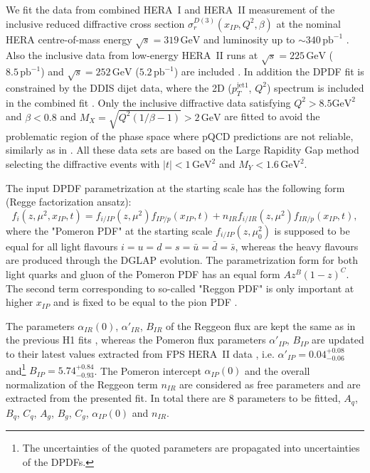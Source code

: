 \documentclass{PoS}
\newcommand{\IP}{I\!\!P}
\newcommand{\IR}{I\!\!R}
\newcommand{\xpom}{x_{\IP}}
\newcommand{\GeV}{\ensuremath{\mathrm{GeV}}\xspace}
\newcommand{\GeVsq}{\ensuremath{\mathrm{GeV}^2}\xspace}
\begin{document}
We fit the data from combined HERA~I and HERA~II measurement of the inclusive reduced diffractive cross section $\sigma_r^{D(3)}(\xpom, Q^2, \beta)$  at the nominal HERA centre-of-mass energy $\sqrt{s} = 319\,\GeV$ and luminosity up to $\sim\!\! 340\,\text{pb}^{-1}$  \cite{Aaron:2012ad}.
Also the inclusive data from low-energy HERA~II runs at $\sqrt{s} = 225\,\GeV$ ($8.5\,\text{pb}^{-1}$) and $\sqrt{s} = 252\,\GeV$ ($5.2\,\text{pb}^{-1}$) are included \cite{Aaron:2012zz}.
In addition the DPDF fit is constrained by the DDIS dijet data, where the 2D ($p_T^{\mathrm{jet}1}$, $Q^2$) spectrum is included in the combined fit \cite{Andreev:2014yra}.
Only the inclusive diffractive data satisfying $Q^2 > 8.5 \GeVsq$ and $\beta < 0.8$ and $M_X = \sqrt{Q^2(1/\beta - 1)} > 2\,\GeV$ are fitted to avoid the problematic region of the phase space where pQCD predictions are not reliable, similarly as in \cite{Aktas:2006hy}.
All these data sets are based on the Large Rapidity Gap method selecting the diffractive events with $|t| < 1\,\GeVsq$ and $M_Y < 1.6\,\GeVsq$.


The input DPDF parametrization at the starting scale has the following form (Regge factorization ansatz):
\begin{equation}
f_i (z, \mu^2, \xpom, t) = f_{i/\IP} (z, \mu^2) f_{\IP/p} (\xpom, t) + n_{\IR} f_{i/\IR} (z, \mu^2) f_{\IR/p} (\xpom, t),
\end{equation}
where the "Pomeron PDF" at the starting scale  $f_{i/\IP}(z, \mu_0^2)$ is supposed to be equal for all light flavours $i=u=d=s = \bar{u} = \bar{d} = \bar{s}$, whereas the heavy flavours are produced through the DGLAP evolution.
The parametrization form for both light quarks and gluon of the Pomeron PDF has an equal form $A z^B (1-z)^C$.
The second term corresponding to so-called "Reggon PDF" is only important at higher $\xpom$ and is fixed to be equal to the pion PDF \cite{Owens:1984zj}.

The parameters  $\alpha_{\IR}(0)$,  $\alpha'_{\IR}$, $B_{\IR}$   of the Reggeon flux are kept the same as in the previous H1 fits \cite{Aktas:2006hy,Aktas:2007bv}, whereas the Pomeron flux parameters $\alpha'_{\IP}$, $B_{\IP}$ are updated to their latest values extracted from FPS HERA~II data \cite{Aaron:2010aa}, i.e. $\alpha'_{\IP} = 0.04^{+0.08}_{-0.06}$ and\footnote{The uncertainties of the quoted parameters are propagated into uncertainties of the DPDFs.} $B_{\IP} = 5.74^{+0.84}_{-0.93}$.
The Pomeron intercept $\alpha_{\IP}(0)$ and the overall normalization of the Reggeon term $n_{\IR}$ are considered as free parameters and are extracted from the presented fit.
In total there are 8 parameters to be fitted, $A_q$, $B_q$, $C_q$, $A_g$, $B_g$, $C_g$, $\alpha_{\IP}(0)$ and $n_{\IR}$.
\end{document}
